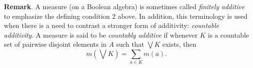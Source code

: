 \documentclass[12pt]{article}
\begin{document}
\textbf{Remark}.  A measure (on a Boolean algebra) is sometimes called \emph{finitely additive} to emphasize the defining condition 2 above.  In addition, this terminology is used when there is a need to contrast a stronger form of additivity: \emph{countable additivity}.  A measure is said to be \emph{countably additive} if whenever $K$ is a countable set of pairwise disjoint elements in $A$ such that $\bigvee K$ exists, then $$m(\bigvee K)=\sum_{a\in K} m(a).$$
\end{document}
